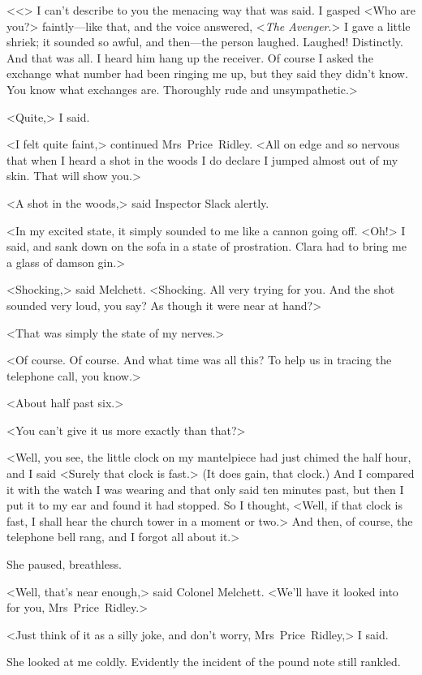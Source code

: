 <<> I can't describe to you the menacing way that was said. I gasped <Who are you?> faintly—like that, and the voice answered, <\emph{The Avenger}.> I gave a little shriek; it sounded so awful, and then—the person laughed. Laughed! Distinctly. And that was all. I heard him hang up the receiver. Of course I asked the exchange what number had been ringing me up, but they said they didn't know. You know what exchanges are. Thoroughly rude and unsympathetic.>

<Quite,> I said.

<I felt quite faint,> continued Mrs~Price~Ridley. <All on edge and so nervous that when I heard a shot in the woods I do declare I jumped almost out of my skin. That will show you.>

<A shot in the woods,> said Inspector Slack alertly.

<In my excited state, it simply sounded to me like a cannon going off. <Oh!> I said, and sank down on the sofa in a state of prostration. Clara had to bring me a glass of damson gin.>

<Shocking,> said Melchett. <Shocking. All very trying for you. And the shot sounded very loud, you say? As though it were near at hand?>

<That was simply the state of my nerves.>

<Of course. Of course. And what time was all this? To help us in tracing the telephone call, you know.>

<About half past six.>

<You can't give it us more exactly than that?>

<Well, you see, the little clock on my mantelpiece had just chimed the half hour, and I said <Surely that clock is fast.> (It does gain, that clock.) And I compared it with the watch I was wearing and that only said ten minutes past, but then I put it to my ear and found it had stopped. So I thought, <Well, if that clock is fast, I shall hear the church tower in a moment or two.> And then, of course, the telephone bell rang, and I forgot all about it.>

She paused, breathless.

<Well, that's near enough,> said Colonel Melchett. <We'll have it looked into for you, Mrs~Price~Ridley.>

<Just think of it as a silly joke, and don't worry, Mrs~Price~Ridley,> I said.

She looked at me coldly. Evidently the incident of the pound note still rankled.


